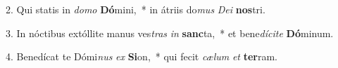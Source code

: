 2. Qui statis in \textit{do}\textit{mo} \textbf{Dó}mini,~*  in átriis do\textit{mus} \textit{De}\textit{i} \textbf{nos}tri.\

3. In nóctibus extóllite manus ves\textit{tras} \textit{in} \textbf{sanc}ta,~*  et bene\textit{dí}\textit{ci}\textit{te} \textbf{Dó}minum.\

4. Benedícat te Dómi\textit{nus} \textit{ex} \textbf{Si}on,~*  qui fecit \textit{cæ}\textit{lum} \textit{et} \textbf{ter}ram.\

